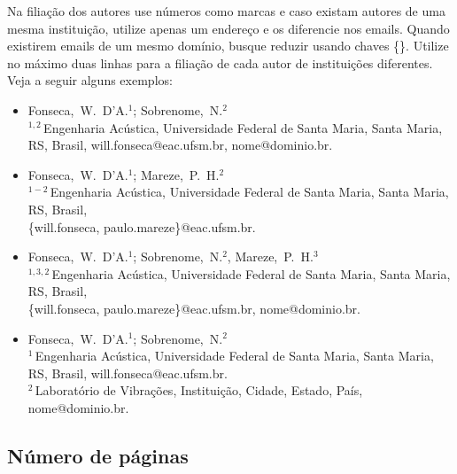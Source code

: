 \documentclass[12pt, a4paper, twoside, onecolumn]{article}
\begin{document}
Na filiação dos autores use números como marcas e caso existam autores de uma mesma instituição, utilize apenas um endereço e os diferencie nos emails. Quando existirem emails de um mesmo domínio, busque reduzir usando chaves \{\}. Utilize no máximo duas linhas para a filiação de cada autor de instituições diferentes. Veja a seguir alguns  exemplos:
%
\begin{flushleft}
\vspace{-0.25\baselineskip}
\begin{itemize}[topsep=-1ex,align=left,leftmargin=0.2cm] \itemsep=4pt

	\item Fonseca,~W.~D'A.$^1$; Sobrenome,~N.$^2$\\[6pt]	
	$^{1,2}$\,Engenharia Acústica, Universidade Federal de Santa Maria, Santa Maria, RS, Brasil, 
	 will.fonseca@eac.ufsm.br, nome@dominio.br.
	
	\item Fonseca,~W.~D'A.$^1$; Mareze,~P.~H.$^2$\\[6pt]	
	$^{1-2}$\,Engenharia Acústica, Universidade Federal de Santa Maria, Santa Maria, RS, Brasil,\\
	\{will.fonseca, paulo.mareze\}@eac.ufsm.br.
	
	\item Fonseca,~W.~D'A.$^1$; Sobrenome,~N.$^2$, Mareze,~P.~H.$^3$\\[6pt]	
	$^{1,3,2}$\,Engenharia Acústica, Universidade Federal de Santa Maria, Santa Maria, RS, Brasil,\\
	\{will.fonseca, paulo.mareze\}@eac.ufsm.br, nome@dominio.br.

	\item Fonseca,~W.~D'A.$^1$; Sobrenome,~N.$^2$\\[6pt]	
	$^{1}$\,Engenharia Acústica, Universidade Federal de Santa Maria, Santa Maria, RS, Brasil,
	will.fonseca@eac.ufsm.br.\\[4pt]		
	$^2$\,Laboratório de Vibrações, Instituição, Cidade, Estado, País, nome@dominio.br.	
\end{itemize}
\vspace{-0.4\baselineskip}
\end{flushleft}

	
\subsection{Número de páginas}
\end{document}
